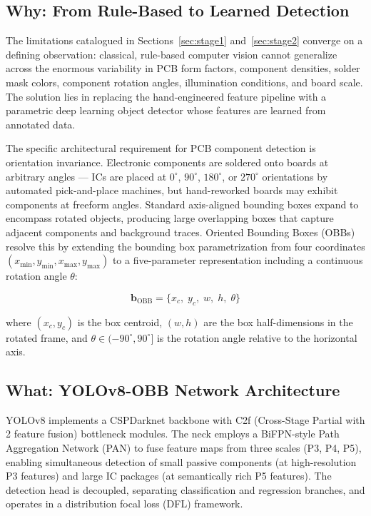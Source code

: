\documentclass[12pt,a4paper]{report}
\begin{document}
\subsection{Why: From Rule-Based to Learned Detection}
\label{subsec:paradigm_shift}

The limitations catalogued in Sections~\ref{sec:stage1} and~\ref{sec:stage2} converge on a defining observation: classical, rule-based computer vision cannot generalize across the enormous variability in PCB form factors, component densities, solder mask colors, component rotation angles, illumination conditions, and board scale. The solution lies in replacing the hand-engineered feature pipeline with a parametric deep learning object detector whose features are learned from annotated data.

The specific architectural requirement for PCB component detection is orientation invariance. Electronic components are soldered onto boards at arbitrary angles --- ICs are placed at $0^{\circ}$, $90^{\circ}$, $180^{\circ}$, or $270^{\circ}$ orientations by automated pick-and-place machines, but hand-reworked boards may exhibit components at freeform angles. Standard axis-aligned bounding boxes expand to encompass rotated objects, producing large overlapping boxes that capture adjacent components and background traces. Oriented Bounding Boxes (OBBs) resolve this by extending the bounding box parametrization from four coordinates $(x_{\min}, y_{\min}, x_{\max}, y_{\max})$ to a five-parameter representation including a continuous rotation angle $\theta$:

\begin{equation}
\label{eq:obb}
\mathbf{b}_{\text{OBB}} = \{x_c, \; y_c, \; w, \; h, \; \theta\}
\end{equation}

where $(x_c, y_c)$ is the box centroid, $(w, h)$ are the box half-dimensions in the rotated frame, and $\theta \in (-90^{\circ}, 90^{\circ}]$ is the rotation angle relative to the horizontal axis.

\subsection{What: YOLOv8-OBB Network Architecture}
\label{subsec:obb_arch}

YOLOv8 implements a CSPDarknet backbone with C2f (Cross-Stage Partial with 2 feature fusion) bottleneck modules. The neck employs a BiFPN-style Path Aggregation Network (PAN) to fuse feature maps from three scales (P3, P4, P5), enabling simultaneous detection of small passive components (at high-resolution P3 features) and large IC packages (at semantically rich P5 features). The detection head is decoupled, separating classification and regression branches, and operates in a distribution focal loss (DFL) framework.
\end{document}
